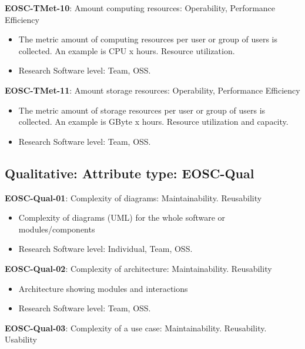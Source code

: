 \textbf{EOSC-TMet-10}: Amount computing resources: Operability, Performance Efficiency

\begin{itemize}
    \item The metric amount of computing resources per user or group of users is collected. An example is CPU x hours. Resource utilization. \cite{iso_25010_2011_2017,orviz_fernandez_eosc-synergy_2020}
    \item Research Software level: Team, OSS.
\end{itemize}

\textbf{EOSC-TMet-11}: Amount storage resources: Operability, Performance Efficiency

\begin{itemize}
    \item The metric amount of storage resources per user or group of users is collected. An example is GByte x hours. Resource utilization and capacity. \cite{iso_25010_2011_2017,orviz_fernandez_eosc-synergy_2020}
    \item Research Software level: Team, OSS.
\end{itemize}

\subsection{Qualitative: Attribute type: EOSC-Qual}

\textbf{EOSC-Qual-01}: Complexity of diagrams: Maintainability. Reusability

\begin{itemize}
    \item Complexity of diagrams (UML) for the whole software or modules/components \cite{montagud_systematic_2012}
    \item Research Software level: Individual, Team, OSS.
\end{itemize}

\textbf{EOSC-Qual-02}: Complexity of architecture: Maintainability. Reusability

\begin{itemize}
    \item Architecture showing modules and interactions \cite{montagud_systematic_2012,zuser_software_2005}
    \item Research Software level: Team, OSS.
\end{itemize}

\textbf{EOSC-Qual-03}: Complexity of a use case: Maintainability. Reusability. Usability

